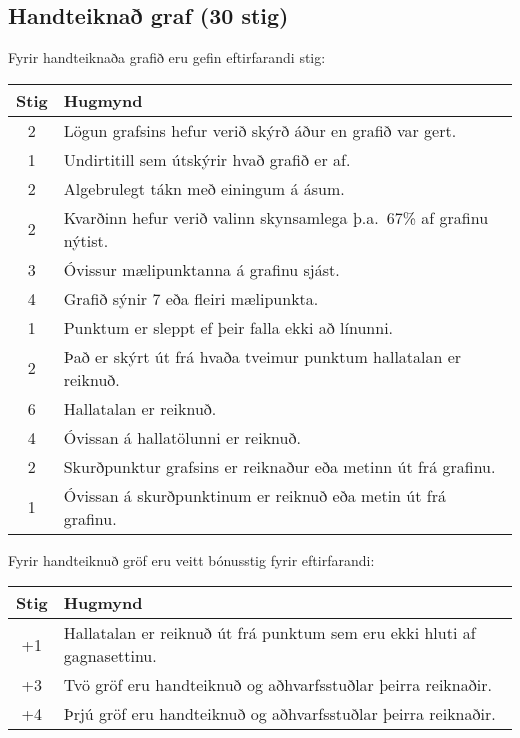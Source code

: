 \begin{tcolorbox}

\subsection*{Handteiknað graf (30 stig)}

Fyrir handteiknaða grafið eru gefin eftirfarandi stig:

\begin{table}[H]
    \centering
    \begin{tabular}{|c|l|}
    \hline
       \textbf{Stig}  & \textbf{Hugmynd}   \\ \hline \hline
        2  & Lögun grafsins hefur verið skýrð áður en grafið var gert. \\ \hline
         1  & Undirtitill sem útskýrir hvað grafið er af. \\ \hline
        2  & Algebrulegt tákn með einingum á ásum. \\ \hline
        2  & Kvarðinn hefur verið valinn skynsamlega þ.a.~67\% af grafinu nýtist. \\ \hline
        3  & Óvissur mælipunktanna á grafinu sjást. \\ \hline
        4  & Grafið sýnir 7 eða fleiri mælipunkta. \\ \hline
        1  & Punktum er sleppt ef þeir falla ekki að línunni. \\ \hline
        2  & Það er skýrt út frá hvaða tveimur punktum hallatalan er reiknuð. \\ \hline
        6  & Hallatalan er reiknuð. \\ \hline
        4  & Óvissan á hallatölunni er reiknuð. \\ \hline
        2  & Skurðpunktur grafsins er reiknaður eða metinn út frá grafinu. \\ \hline
        1  & Óvissan á skurðpunktinum er reiknuð eða metin út frá grafinu.  \\ \hline
    \end{tabular}
\end{table}

Fyrir handteiknuð gröf eru veitt bónusstig fyrir eftirfarandi:


\begin{table}[H]
    \centering
    \begin{tabular}{|c|l|}
    \hline
       \textbf{Stig}  & \textbf{Hugmynd}   \\ \hline \hline
        +1  & Hallatalan er reiknuð út frá punktum sem eru ekki hluti af gagnasettinu.
        \\\hline
        +3  & Tvö gröf eru handteiknuð og aðhvarfsstuðlar þeirra reiknaðir.
        \\\hline
        +4   & Þrjú gröf eru handteiknuð og aðhvarfsstuðlar þeirra reiknaðir.
        \\\hline
    \end{tabular}
\end{table}


\end{tcolorbox}
